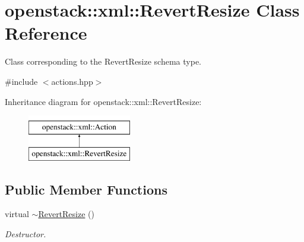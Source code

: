 \hypertarget{classopenstack_1_1xml_1_1RevertResize}{
\section{openstack::xml::RevertResize Class Reference}
\label{classopenstack_1_1xml_1_1RevertResize}
}


Class corresponding to the RevertResize schema type.  




{\ttfamily \#include $<$actions.hpp$>$}

Inheritance diagram for openstack::xml::RevertResize:\begin{figure}[H]
\begin{center}
\leavevmode
\includegraphics[height=2.000000cm]{classopenstack_1_1xml_1_1RevertResize}
\end{center}
\end{figure}
\subsection*{Public Member Functions}
\begin{DoxyCompactItemize}
\item 
\hypertarget{classopenstack_1_1xml_1_1RevertResize_a2f68e97c774bb684ae4d21a5f4c8acb4}{
virtual \hyperlink{classopenstack_1_1xml_1_1RevertResize_a2f68e97c774bb684ae4d21a5f4c8acb4}{$\sim$RevertResize} ()}
\label{classopenstack_1_1xml_1_1RevertResize_a2f68e97c774bb684ae4d21a5f4c8acb4}

\begin{DoxyCompactList}\small\item\em Destructor. \item\end{DoxyCompactList}\end{DoxyCompactItemize}
